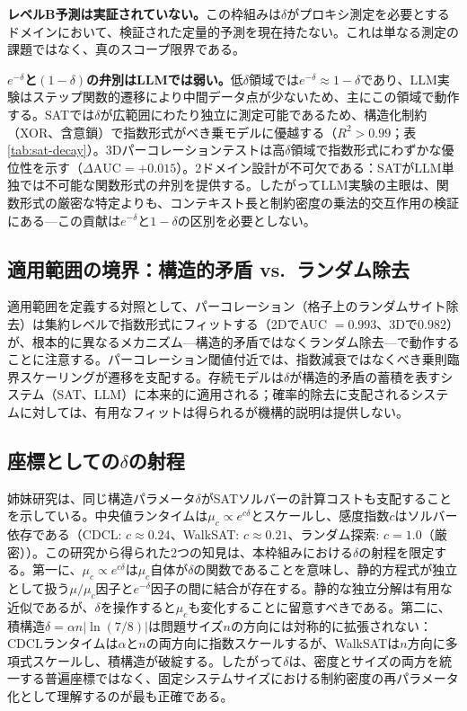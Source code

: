 \documentclass[11pt,a4paper]{article}
\begin{document}
\textbf{レベルB予測は実証されていない。}この枠組みは$\delta$がプロキシ測定を必要とするドメインにおいて、検証された定量的予測を現在持たない。これは単なる測定の課題ではなく、真のスコープ限界である。

\textbf{$e^{-\delta}$と$(1-\delta)$の弁別はLLMでは弱い。}低$\delta$領域では$e^{-\delta} \approx 1 - \delta$であり、LLM実験はステップ関数的遷移により中間データ点が少ないため、主にこの領域で動作する。SATでは$\delta$が広範囲にわたり独立に測定可能であるため、構造化制約（XOR、含意鎖）で指数形式がべき乗モデルに優越する（$R^2 > 0.99$；表\ref{tab:sat-decay}）。3Dパーコレーションテストは高$\delta$領域で指数形式にわずかな優位性を示す（$\Delta\text{AUC} = +0.015$）。2ドメイン設計が不可欠である：SATがLLM単独では不可能な関数形式の弁別を提供する。したがってLLM実験の主眼は、関数形式の厳密な特定よりも、コンテキスト長と制約密度の乗法的交互作用の検証にある---この貢献は$e^{-\delta}$と$1-\delta$の区別を必要としない。

\subsection{適用範囲の境界：構造的矛盾 vs.\ ランダム除去}

適用範囲を定義する対照として、パーコレーション（格子上のランダムサイト除去）は集約レベルで指数形式にフィットする（2DでAUC $= 0.993$、3Dで$0.982$）が、根本的に異なるメカニズム---構造的矛盾ではなくランダム除去---で動作することに注意する。パーコレーション閾値付近では、指数減衰ではなくべき乗則臨界スケーリングが遷移を支配する。存続モデルは$\delta$が構造的矛盾の蓄積を表すシステム（SAT、LLM）に本来的に適用される；確率的除去に支配されるシステムに対しては、有用なフィットは得られるが機構的説明は提供しない。

\subsection{座標としての\texorpdfstring{$\delta$}{δ}の射程}
\label{sec:delta-scope}

姉妹研究\cite{sunagawa2026sat}は、同じ構造パラメータ$\delta$がSATソルバーの計算コストも支配することを示している。中央値ランタイムは$\mu_c \propto e^{c\delta}$とスケールし、感度指数$c$はソルバー依存である（CDCL: $c \approx 0.24$、WalkSAT: $c \approx 0.21$、ランダム探索: $c = 1.0$（厳密））。この研究から得られた2つの知見は、本枠組みにおける$\delta$の射程を限定する。第一に、$\mu_c \propto e^{c\delta}$は$\mu_c$自体が$\delta$の関数であることを意味し、静的方程式が独立として扱う$\mu/\mu_c$因子と$e^{-\delta}$因子の間に結合が存在する。静的な独立分解は有用な近似であるが、$\delta$を操作すると$\mu_c$も変化することに留意すべきである。第二に、積構造$\delta = \alpha n |\ln(7/8)|$は問題サイズ$n$の方向には対称的に拡張されない：CDCLランタイムは$\alpha$と$n$の両方向に指数スケールするが、WalkSATは$n$方向に多項式スケールし、積構造が破綻する。したがって$\delta$は、密度とサイズの両方を統一する普遍座標ではなく、固定システムサイズにおける制約密度の再パラメータ化として理解するのが最も正確である。
\end{document}
